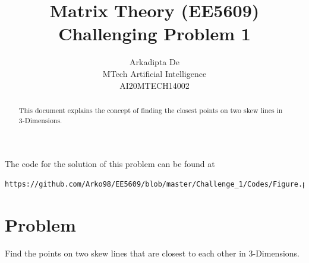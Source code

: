 \documentclass[journal,12pt,twocolumn]{IEEEtran}
\begin{document}
\makeatletter
{}
\makeatother
\let\StandardTheFigure\thefigure
\let\vec\mathbf
\renewcommand{\thefigure}{\theproblem}
\def\putbox#1#2#3{\makebox[0in][l]{\makebox[#1][l]{}\raisebox{\baselineskip}[0in][0in]{\raisebox{#2}[0in][0in]{#3}}}}
     \def\rightbox#1{\makebox[0in][r]{#1}}
     \def\centbox#1{\makebox[0in]{#1}}
     \def\topbox#1{\raisebox{-\baselineskip}[0in][0in]{#1}}
     \def\midbox#1{\raisebox{-0.5\baselineskip}[0in][0in]{#1}}
\vspace{3cm}
\title{Matrix Theory (EE5609) Challenging Problem 1}
\author{Arkadipta De\\MTech Artificial Intelligence\\AI20MTECH14002}

\maketitle
\newpage
\bigskip
\renewcommand{\thefigure}{\theenumi}
\renewcommand{\thetable}{\theenumi}

\begin{abstract}
This document explains the concept of finding the closest points on two skew lines in 3-Dimensions.
\end{abstract}
The code for the solution of this problem can be found at
%
\begin{lstlisting}
https://github.com/Arko98/EE5609/blob/master/Challenge_1/Codes/Figure.py
\end{lstlisting}
%
\section{Problem}
Find the points on two skew lines that are closest to each other in 3-Dimensions.
\end{document}
